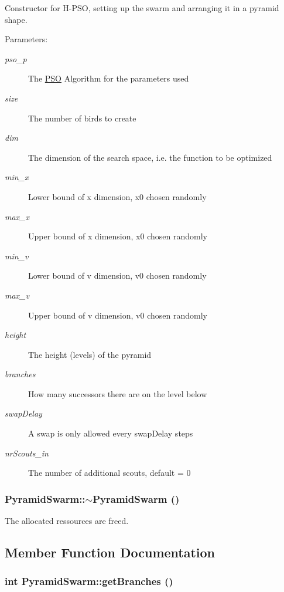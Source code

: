 Constructor for H-PSO, setting up the swarm and arranging it in a pyramid shape. 

\begin{Desc}
\item[Parameters: ]\par
\begin{description}
\item[{\em 
pso\_\-p}]The \hyperlink{classPSO}{PSO} Algorithm for the parameters used \item[{\em 
size}]The number of birds to create \item[{\em 
dim}]The dimension of the search space, i.e. the function to be optimized \item[{\em 
min\_\-x}]Lower bound of x dimension, x0 chosen randomly \item[{\em 
max\_\-x}]Upper bound of x dimension, x0 chosen randomly \item[{\em 
min\_\-v}]Lower bound of v dimension, v0 chosen randomly \item[{\em 
max\_\-v}]Upper bound of v dimension, v0 chosen randomly \item[{\em 
height}]The height (levels) of the pyramid \item[{\em 
branches}]How many successors there are on the level below \item[{\em 
swapDelay}]A swap is only allowed every swapDelay steps \item[{\em 
nrScouts\_\-in}]The number of additional scouts, default = 0 \end{description}
\end{Desc}
\hypertarget{classPyramidSwarm_bf3027f08a160137dc7d8a12727a28eb}{
\subsubsection{\setlength{\rightskip}{0pt plus 5cm}PyramidSwarm::$\sim$PyramidSwarm ()}}
\label{classPyramidSwarm_bf3027f08a160137dc7d8a12727a28eb}


The allocated ressources are freed. 



\subsection{Member Function Documentation}
\hypertarget{classPyramidSwarm_9372ad747da64c8f3fd904da02c36d41}{
\subsubsection{\setlength{\rightskip}{0pt plus 5cm}int PyramidSwarm::getBranches ()}}
\label{classPyramidSwarm_9372ad747da64c8f3fd904da02c36d41}



